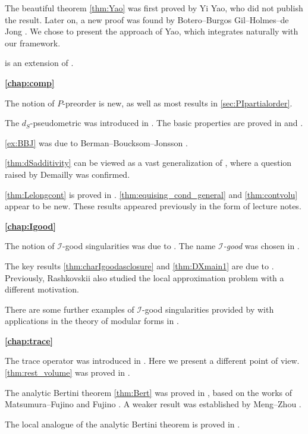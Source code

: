 The beautiful theorem \cref{thm:Yao} was first proved by Yi Yao, who did not publish the result. Later on, a new proof was found by Botero--Burgos Gil--Holmes--de Jong \cite{BBGHdJ21}. We chose to present the approach of Yao, which integrates naturally with our framework.

 is an extension of \cite[Proposition~2.9]{BB13}.

\textbf{\cref{chap:comp}}

The notion of $P$-preorder is new, as well as most results in \cref{sec:PIpartialorder}.

The $d_S$-pseudometric was introduced in \cite{DDNLmetric}. The basic properties are proved in \cite{DDNLmetric} and \cite{Xia21}.

\cref{ex:BBJ} was due to Berman--Boucksom--Jonsson \cite{BBJ21}.

\cref{thm:dSadditivity} can be viewed as a vast generalization of \cite{Cao15}, where a question raised by Demailly was confirmed.

\cref{thm:Lelongcont} is proved in \cite{Xia22}. \cref{thm:equising_cond_general} and \cref{thm:contvolu} appear to be new. These results appeared previously in the form of lecture notes.

\textbf{\cref{chap:Igood}}

The notion of $\mathcal{I}$-good singularities was due to \cite{DX21}. The name \emph{$\mathcal{I}$-good} was chosen in \cite{Xia22}.


The key results \cref{thm:charIgoodasclosure} and \cref{thm:DXmain1} are due to \cite{DX21, DX22}. Previously, Rashkovskii \cite{Ra13} also studied the local approximation problem with a different motivation.

There are some further examples of $\mathcal{I}$-good singularities provided by \cite{BBGHdJ21} with applications in the theory of modular forms in \cite{BBGHdJ22}.

\textbf{\cref{chap:trace}}

The trace operator was introduced in \cite{DX24}. Here we present a different point of view. \cref{thm:rest_volume} was proved in \cite{DX24}.

The analytic Bertini theorem \cref{thm:Bert} was proved in \cite{XiaBer}, based on the works of Matsumura--Fujino \cite{FM21} and Fujino \cite{Fuj23}. A weaker result was established by Meng--Zhou \cite{MZ23}.

The local analogue of the analytic Bertini theorem is proved in \cite{XiaBerII}.


